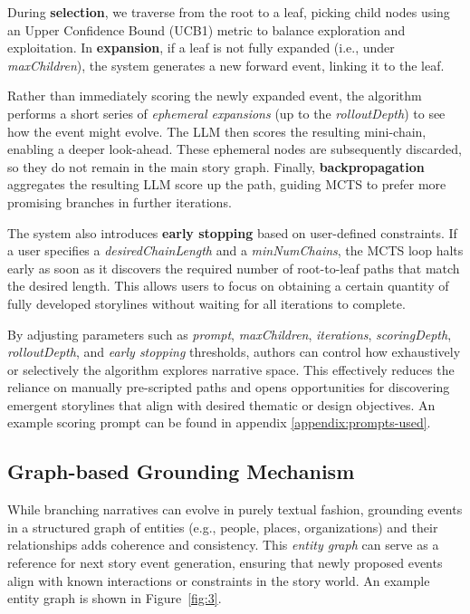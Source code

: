\documentclass[11pt]{article}
\begin{document}
During \textbf{selection}, we traverse from the root to a leaf, picking child nodes using an Upper Confidence Bound (UCB1) metric to balance exploration and exploitation. In \textbf{expansion}, if a leaf is not fully expanded (i.e., under \textit{maxChildren}), the system generates a new forward event, linking it to the leaf.

Rather than immediately scoring the newly expanded event, the algorithm performs a short series of \emph{ephemeral expansions} (up to the \textit{rolloutDepth}) to see how the event might evolve. The LLM then scores the resulting mini-chain, enabling a deeper look-ahead. These ephemeral nodes are subsequently discarded, so they do not remain in the main story graph. Finally, \textbf{backpropagation} aggregates the resulting LLM score up the path, guiding MCTS to prefer more promising branches in further iterations.

The system also introduces \textbf{early stopping} based on user-defined constraints. If a user specifies a \textit{desiredChainLength} and a \textit{minNumChains}, the MCTS loop halts early as soon as it discovers the required number of root-to-leaf paths that match the desired length. This allows users to focus on obtaining a certain quantity of fully developed storylines without waiting for all iterations to complete.

By adjusting parameters such as \textit{prompt}, \textit{maxChildren}, \textit{iterations}, \textit{scoringDepth}, \textit{rolloutDepth}, and \textit{early stopping} thresholds, authors can control how exhaustively or selectively the algorithm explores narrative space. This effectively reduces the reliance on manually pre-scripted paths and opens opportunities for discovering emergent storylines that align with desired thematic or design objectives. An example scoring prompt can be found in appendix \ref{appendix:prompts-used}.

\subsection{Graph-based Grounding Mechanism}

While branching narratives can evolve in purely textual fashion, grounding events in a structured graph of entities (e.g., people, places, organizations) and their relationships adds coherence and consistency. This \emph{entity graph} can serve as a reference for next story event generation, ensuring that newly proposed events align with known interactions or constraints in the story world. An example entity graph is shown in Figure~\ref{fig:3}.
\end{document}
